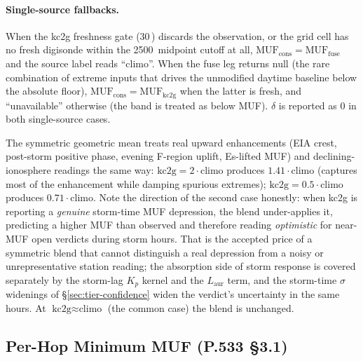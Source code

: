 \documentclass[11pt,a4paper]{article}
\newcommand{\SI}[2]{#1\,\text{#2}}
\newcommand{\km}{\text{km}}
\newcommand{\minute}{\text{min}}
\begin{document}
\paragraph{Single-source fallbacks.}  When the kc2g freshness gate
(\SI{30}{\minute}) discards the observation, or the grid cell
has no fresh digisonde within the \SI{2500}{\km} midpoint cutoff
at all, $\text{MUF}_{\text{cons}}
= \text{MUF}_{\text{fuse}}$ and the source label reads ``climo''.
When the fuse leg returns null (the rare combination of
extreme inputs that drives the unmodified daytime baseline below
the absolute floor), $\text{MUF}_{\text{cons}} =
\text{MUF}_{\text{kc2g}}$ when the latter is fresh, and
``unavailable'' otherwise (the band is treated as below MUF).
$\delta$ is reported as $0$ in both single-source cases.

The symmetric geometric mean treats real upward enhancements (EIA
crest, post-storm positive phase, evening F-region uplift,
Es-lifted MUF) and declining-ionosphere readings the same way:
$\text{kc2g} = 2 \cdot \text{climo}$ produces $1.41 \cdot
\text{climo}$ (captures most of the enhancement while damping
spurious extremes); $\text{kc2g} = 0.5 \cdot \text{climo}$
produces $0.71 \cdot \text{climo}$.  Note the direction of the
second case honestly: when kc2g is reporting a \emph{genuine}
storm-time MUF depression, the blend under-applies it,
predicting a higher MUF than observed and therefore reading
\emph{optimistic} for near-MUF open verdicts during storm hours.
That is the accepted price of a symmetric blend that cannot
distinguish a real depression from a noisy or unrepresentative
station reading; the absorption side of storm response is
covered separately by the storm-lag $K_p$ kernel and the
$L_{\text{aur}}$ term, and the storm-time $\sigma$ widenings of
\S\ref{sec:tier-confidence} widen the verdict's uncertainty in
the same hours.  At $\text{kc2g} \approx \text{climo}$ (the
common case) the blend is unchanged.

\subsection{Per-Hop Minimum MUF (P.533 \S3.1)}\label{sec:perhopmuf}
\end{document}
